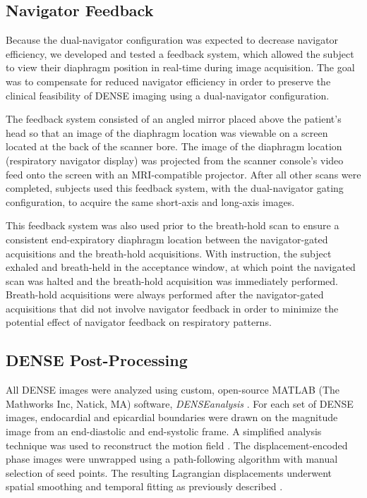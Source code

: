\subsection{Navigator Feedback}
	Because the dual-navigator configuration was expected to decrease navigator efficiency, we developed and tested a feedback system, which allowed the subject to view their diaphragm position in real-time during image acquisition. The goal was to compensate for reduced navigator efficiency in order to preserve the clinical feasibility of DENSE imaging using a dual-navigator configuration.
	
	The feedback system consisted of an angled mirror placed above the patient's head so that an image of the diaphragm location was viewable on a screen located at the back of the scanner bore. The image of the diaphragm location (respiratory navigator display) was projected from the scanner console's video feed onto the screen with an MRI-compatible projector. After all other scans were completed, subjects used this feedback system, with the dual-navigator gating configuration, to acquire the same short-axis and long-axis images.
	
	This feedback system was also used prior to the breath-hold scan to ensure a consistent end-expiratory diaphragm location between the navigator-gated acquisitions and the breath-hold acquisitions. With instruction, the subject exhaled and breath-held in the acceptance window, at which point the navigated scan was halted and the breath-hold acquisition was immediately performed. Breath-hold acquisitions were always performed after the navigator-gated acquisitions that did not involve navigator feedback in order to minimize the potential effect of navigator feedback on respiratory patterns.

\subsection{DENSE Post-Processing}
	All DENSE images were analyzed using custom, open-source MATLAB (The Mathworks Inc, Natick, MA) software, \textit{DENSEanalysis} \cite{Gilliam2016a}. For each set of DENSE images, endocardial and epicardial boundaries were drawn on the magnitude image from an end-diastolic and end-systolic frame. A simplified analysis technique was used to reconstruct the motion field \cite{Suever2014}. The displacement-encoded phase images were unwrapped using a path-following algorithm with manual selection of seed points. The resulting Lagrangian displacements underwent spatial smoothing and temporal fitting as previously described \cite{Spottiswoode2007}.
	
